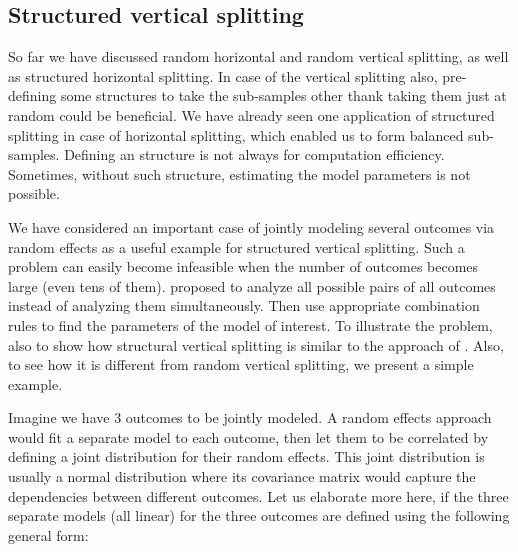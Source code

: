 \documentclass[11pt,a5paper,twoside]{book}
\begin{document}
\subsection{Structured vertical splitting} 

So far we have discussed random horizontal and random vertical splitting, as well as structured horizontal splitting. In case of the vertical splitting also, pre-defining some structures to take the sub-samples other thank taking them just at random could be beneficial. We have already seen one application of structured splitting in case of horizontal splitting, which enabled us to form balanced sub-samples. Defining an structure is not always for computation efficiency. Sometimes, without such structure, estimating the model parameters is not possible. 

We have considered an important case of jointly modeling several outcomes via random effects as a useful example for structured vertical splitting. Such a problem can easily become infeasible when the number of outcomes becomes large (even tens of them). \cite{fieuws2006, fieuws2007} proposed to analyze all possible pairs of all outcomes instead of analyzing them simultaneously. Then use appropriate combination rules to find the parameters of the model of interest. To illustrate the problem, also to show how structural vertical splitting is similar to the approach of \cite{fieuws2006, fieuws2007}. Also, to see how it is different from random vertical splitting, we present a simple example. 

Imagine we have 3 outcomes to be jointly modeled. A random effects approach would fit a separate model to each outcome, then let them to be correlated by defining a joint distribution for their random effects. This joint distribution is usually a normal distribution where its covariance matrix would capture the dependencies between different outcomes. Let us elaborate more here, if the three separate models (all linear) for the three outcomes are defined using the following general form:
\end{document}
